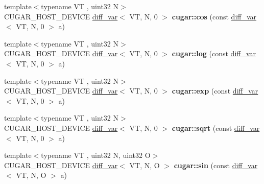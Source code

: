 \begin{DoxyCompactItemize}
\mbox{\label{group___auto_diff_module_ga1f1d0420b52ede3af7a81fff7391249b}} 
{\footnotesize template$<$typename VT , uint32 N$>$ }\\C\+U\+G\+A\+R\+\_\+\+H\+O\+S\+T\+\_\+\+D\+E\+V\+I\+CE \hyperlink{structcugar_1_1diff__var}{diff\+\_\+var}$<$ VT, N, 0 $>$ {\bfseries cugar\+::cos} (const \hyperlink{structcugar_1_1diff__var}{diff\+\_\+var}$<$ VT, N, 0 $>$ a)
\item 
\mbox{\label{group___auto_diff_module_ga1a4e1874a738787c4e88330531589093}} 
{\footnotesize template$<$typename VT , uint32 N$>$ }\\C\+U\+G\+A\+R\+\_\+\+H\+O\+S\+T\+\_\+\+D\+E\+V\+I\+CE \hyperlink{structcugar_1_1diff__var}{diff\+\_\+var}$<$ VT, N, 0 $>$ {\bfseries cugar\+::log} (const \hyperlink{structcugar_1_1diff__var}{diff\+\_\+var}$<$ VT, N, 0 $>$ a)
\item 
\mbox{\label{group___auto_diff_module_ga2e9296a1f9e3d974732944e392e95c31}} 
{\footnotesize template$<$typename VT , uint32 N$>$ }\\C\+U\+G\+A\+R\+\_\+\+H\+O\+S\+T\+\_\+\+D\+E\+V\+I\+CE \hyperlink{structcugar_1_1diff__var}{diff\+\_\+var}$<$ VT, N, 0 $>$ {\bfseries cugar\+::exp} (const \hyperlink{structcugar_1_1diff__var}{diff\+\_\+var}$<$ VT, N, 0 $>$ a)
\item 
\mbox{\label{group___auto_diff_module_gac4c2f25d2248f289e4edc532985b419d}} 
{\footnotesize template$<$typename VT , uint32 N$>$ }\\C\+U\+G\+A\+R\+\_\+\+H\+O\+S\+T\+\_\+\+D\+E\+V\+I\+CE \hyperlink{structcugar_1_1diff__var}{diff\+\_\+var}$<$ VT, N, 0 $>$ {\bfseries cugar\+::sqrt} (const \hyperlink{structcugar_1_1diff__var}{diff\+\_\+var}$<$ VT, N, 0 $>$ a)
\item 
\mbox{\label{group___auto_diff_module_gac552d562eadb6017de50b7c766408433}} 
{\footnotesize template$<$typename VT , uint32 N, uint32 O$>$ }\\C\+U\+G\+A\+R\+\_\+\+H\+O\+S\+T\+\_\+\+D\+E\+V\+I\+CE \hyperlink{structcugar_1_1diff__var}{diff\+\_\+var}$<$ VT, N, O $>$ {\bfseries cugar\+::sin} (const \hyperlink{structcugar_1_1diff__var}{diff\+\_\+var}$<$ VT, N, O $>$ a)
\item 
\mbox{\label{group___auto_diff_module_ga4611db7a828fbced475b4d6d52414ffe}} 

\end{DoxyCompactItemize}
